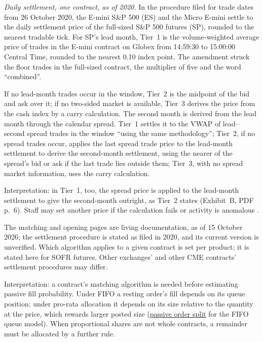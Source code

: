 \begin{qfconvention}
\emph{Daily settlement, one contract, as of 2020.} In the procedure filed for trade dates from 26 October 2020, the E-mini S\&P 500 (ES) and the Micro E-mini settle to the daily settlement price of the full-sized S\&P 500 futures (SP), rounded to the nearest tradable tick. For SP's lead month, Tier~1 is the volume-weighted average price of trades in the E-mini contract on Globex from 14:59:30 to 15:00:00 Central Time, rounded to the nearest 0.10 index point. The amendment struck the floor trades in the full-sized contract, the multiplier of five and the word ``combined''.

If no lead-month trades occur in the window, Tier~2 is the midpoint of the bid and ask over it; if no two-sided market is available, Tier~3 derives the price from the cash index by a carry calculation. The second month is derived from the lead month through the calendar spread. Tier~1 settles it to the VWAP of lead--second spread trades in the window ``using the same methodology''; Tier~2, if no spread trades occur, applies the last spread trade price to the lead-month settlement to derive the second-month settlement, using the nearer of the spread's bid or ask if the last trade lies outside them; Tier~3, with no spread market information, uses the carry calculation.

Interpretation: in Tier~1, too, the spread price is applied to the lead-month settlement to give the second-month outright, as Tier~2 states (Exhibit~B, PDF p.~6). Staff may set another price if the calculation fails or activity is anomalous \citep[Exhibit~B, blackline]{cme-es-settlement-2020}.

 The matching and opening pages are living documentation, as of 15 October 2026; the settlement procedure is stated as filed in 2020, and its current version is unverified. Which algorithm applies to a given contract is set per product; it is stated here for SOFR futures. Other exchanges' and other CME contracts' settlement procedures may differ.

 Interpretation: a contract's matching algorithm is needed before estimating passive fill probability. Under FIFO a resting order's fill depends on its queue position; under pro-rata allocation it depends on its size relative to the quantity at the price, which rewards larger posted size (\hyperref[meth:passive-order-split]{passive order split} for the FIFO queue model). When proportional shares are not whole contracts, a remainder must be allocated by a further rule.


\end{qfconvention}
